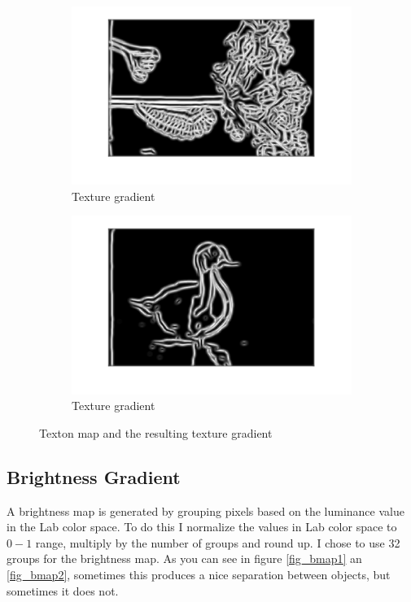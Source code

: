 \documentclass[12pt]{article}
\begin{document}
\begin{figure}
    \begin{subfigure}[t]{.49\textwidth}
        \centering
        \includegraphics[width=\linewidth]{img/tg1}
        \caption{Texture gradient}
    \end{subfigure}\hfill
    \begin{subfigure}[t]{.49\textwidth}
        \centering
        \includegraphics[width=\linewidth]{img/tg2}
        \caption{Texture gradient}
    \end{subfigure}
    \caption{Texton map and the resulting texture gradient}
    \label{fig_bg}
\end{figure}

\subsection{Brightness Gradient}

A brightness map is generated by grouping pixels based on the luminance value in the Lab color space. To do this I normalize the values in Lab color space to $0-1$ range, multiply by the number of groups and round up. I chose to use 32 groups for the brightness map. As you can see in figure \ref{fig_bmap1} an \ref{fig_bmap2}, sometimes this produces a nice separation between objects, but sometimes it does not.
\end{document}

